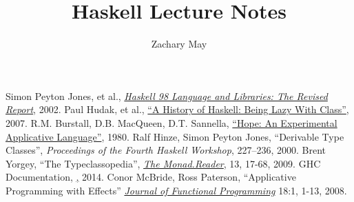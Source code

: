\documentclass[12pt]{article}
\author{Zachary May}
\title{Haskell Lecture Notes}
\begin{document}
\maketitle










\begin{thebibliography}{99}
  Simon Peyton Jones, et al.,
  \href{http://www.haskell.org/onlinereport/index.html}{\emph{Haskell 98 Language and Libraries: The Revised Report}},
  2002.
  Paul Hudak, et al.,
  \href{http://www.scs.stanford.edu/\~dbg/readings/haskell-history.pdf}{``A History of Haskell: Being Lazy With Class''},
  2007.
  R.M. Burstall, D.B. MacQueen, D.T. Sannella,
  \href{http://homepages.inf.ed.ac.uk/dts/pub/hope.pdf}{``Hope: An Experimental Applicative Language''},
  1980.
  Ralf Hinze, Simon Peyton Jones,
  ``Derivable Type Classes'',
  \emph{Proceedings of the Fourth Haskell Workshop}, 227--236,
  2000.
  Brent Yorgey,
  ``The Typeclassopedia'',
  \href{http://www.haskell.org/wikiupload/8/85/TMR-Issue13.pdf}{\emph{The Monad.Reader}}, 13, 17-68,
  2009.
  GHC Documentation,
  \href{http://www.haskell.org/ghc/docs/7.8.3/html/},
  2014.
  Conor McBride, Ross Paterson,
  ``Applicative Programming with Effects''
  \href{}{\emph{Journal of Functional Programming}} 18:1, 1-13,
  2008.
\end{thebibliography}
\end{document}
